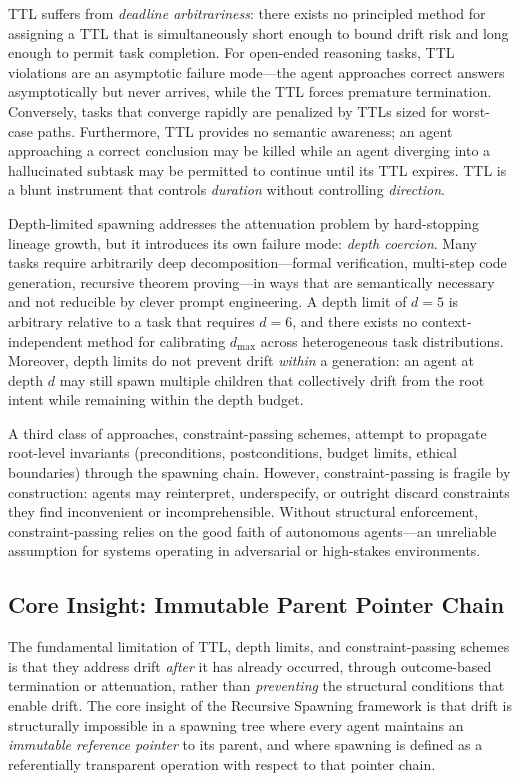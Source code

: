 TTL suffers from \textit{deadline arbitrariness}: there exists no principled method for assigning a TTL that is simultaneously short enough to bound drift risk and long enough to permit task completion. For open-ended reasoning tasks, TTL violations are an asymptotic failure mode—the agent approaches correct answers asymptotically but never arrives, while the TTL forces premature termination. Conversely, tasks that converge rapidly are penalized by TTLs sized for worst-case paths. Furthermore, TTL provides no semantic awareness; an agent approaching a correct conclusion may be killed while an agent diverging into a hallucinated subtask may be permitted to continue until its TTL expires. TTL is a blunt instrument that controls \textit{duration} without controlling \textit{direction}.

Depth-limited spawning addresses the attenuation problem by hard-stopping lineage growth, but it introduces its own failure mode: \textit{depth coercion}. Many tasks require arbitrarily deep decomposition—formal verification, multi-step code generation, recursive theorem proving—in ways that are semantically necessary and not reducible by clever prompt engineering. A depth limit of $d=5$ is arbitrary relative to a task that requires $d=6$, and there exists no context-independent method for calibrating $d_{\max}$ across heterogeneous task distributions. Moreover, depth limits do not prevent drift \textit{within} a generation: an agent at depth $d$ may still spawn multiple children that collectively drift from the root intent while remaining within the depth budget.

A third class of approaches, constraint-passing schemes, attempt to propagate root-level invariants (preconditions, postconditions, budget limits, ethical boundaries) through the spawning chain. However, constraint-passing is fragile by construction: agents may reinterpret, underspecify, or outright discard constraints they find inconvenient or incomprehensible. Without structural enforcement, constraint-passing relies on the good faith of autonomous agents—an unreliable assumption for systems operating in adversarial or high-stakes environments.

\subsection{Core Insight: Immutable Parent Pointer Chain}

The fundamental limitation of TTL, depth limits, and constraint-passing schemes is that they address drift \textit{after} it has already occurred, through outcome-based termination or attenuation, rather than \textit{preventing} the structural conditions that enable drift. The core insight of the Recursive Spawning framework is that drift is structurally impossible in a spawning tree where every agent maintains an \textit{immutable reference pointer} to its parent, and where spawning is defined as a referentially transparent operation with respect to that pointer chain.

